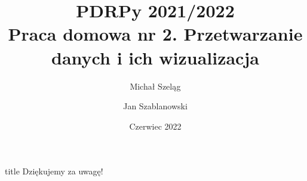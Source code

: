 \documentclass{beamer}
\title{PDRPy 2021/2022\\Praca domowa nr 2. Przetwarzanie danych i ich wizualizacja}
\author{Michał Szeląg \and Jan Szablanowski }
\date{Czerwiec 2022}
\begin{document}
\maketitle






\begin{frame}
    \vfill
    \centering
    \begin{beamercolorbox}[sep=8pt,center,shadow=true,rounded=true]{title}
         Dziękujemy za uwagę!
    \end{beamercolorbox}
    \vfill
\end{frame}
\end{document}

